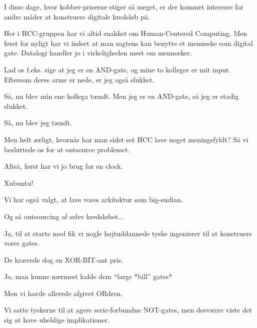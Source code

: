 \documentclass[a4paper,11pt]{article}
\begin{document}
\begin{sketch}

 I disse dage, hvor kobber-priserne stiger så meget, er der kommet
interesse for andre måder at konstruere digitale kredsløb på.

 Her i HCC-gruppen har vi altid snakket om Human-Centered Computing. Men
først for nyligt har vi indset at man sagtens kan benytte et menneske som
digital gate. Datalogi handler jo i virkeligheden mest om mennesker.

 Lad os f.eks. sige at jeg er en AND-gate, og mine to kolleger er mit
input. Eftersom deres arme er nede, er jeg også slukket.


 Så, nu blev min ene kollega tændt. Men jeg er en AND-gate, så jeg er
stadig slukket.


 Så, nu blev jeg tændt.


 Men helt ærligt, hvornår har man sidst set HCC lave noget meningsfyldt?
Så vi besluttede os for at outsource problemet.

 Altså, først har vi jo brug for en clock.

 Xubuntu!


 Vi har også valgt, at lave vores arkitektur som big-endian.


 Og så outsourcing af selve kredsløbet...

 Ja, til at starte med fik vi nogle højtuddannede tyske
ingeniører til at konstruere vores gates.

 De krævede dog en XOR-BIT-ant pris.

 Ja, man kunne nærmest kalde dem ``large *bill'' gates*

 Men vi havde allerede afgivet ORdren.


  Vi satte tyskerne til at agere serie-forbundne NOT-gates, men desværre
viste det sig at have uheldige implikationer.


\end{sketch}
\end{document}
